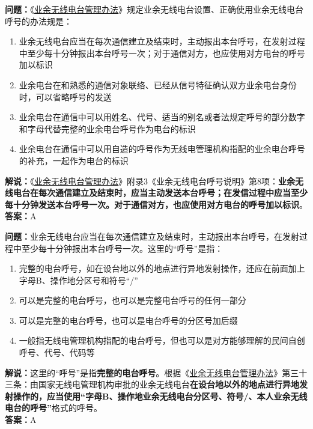 \textbf{问题：}《\href{https://www.miit.gov.cn/jgsj/zfs/bmgz/art/2020/art_147b69815b3641caad9047735f94c860.html}{业余无线电台管理办法}》规定业余无线电台设置、正确使用业余无线电台呼号的办法规是：
\begin{enumerate}[label=\Alph*), leftmargin=1.5cm]
	\item 业余无线电台应当在每次通信建立及结束时，主动报出本台呼号，在发射过程中至少每十分钟报出本台呼号一次；对于通信对方，也应使用对方电台的呼号加以标识
	\item 业余电台在和熟悉的通信对象联络、已经从信号特征确认双方业余电台身份时，可以省略呼号的发送
	\item 业余电台在通信中可以用姓名、代号、适当的别名或者法规定呼号的部分数字和字母代替完整的业余电台呼号作为电台的标识
	\item 业余电台在通信中可以用自造的呼号作为无线电管理机构指配的业余电台呼号的补充，一起作为电台的标识
\end{enumerate}
\textbf{解说：}《\href{https://www.miit.gov.cn/jgsj/zfs/bmgz/art/2020/art_147b69815b3641caad9047735f94c860.html}{业余无线电台管理办法}》附录3《业余无线电台呼号说明》第8项：\textbf{业余无线电台在每次通信建立及结束时，应当主动发送本台呼号；在发信过程中应当至少每十分钟发送本台呼号一次。对于通信对方，也应使用对方电台的呼号加以标识}。\\\textbf{答案：}A

\textbf{问题：}业余无线电台应当在每次通信建立及结束时，主动报出本台呼号，在发射过程中至少每十分钟报出本台呼号一次。这里的“呼号”是指：
\begin{enumerate}[label=\Alph*), leftmargin=1.5cm]
	\item 完整的电台呼号，如在设台地以外的地点进行异地发射操作，还应在前面加上字母B、操作地分区号和符号“/”
	\item 可以是完整的电台呼号，也可以是完整电台呼号的任何一部分
	\item 可以是完整的电台呼号，也可以是电台呼号的分区号加后缀
	\item 一般指无线电管理机构指配的电台呼号，但也可以是对方能够理解的民间自创呼号、代号、代码等
\end{enumerate}
\textbf{解说：}这里的“呼号”是指\textbf{完整的电台呼号}。根据《\href{https://www.miit.gov.cn/jgsj/zfs/bmgz/art/2020/art_147b69815b3641caad9047735f94c860.html}{业余无线电台管理办法}》第三十三条：由国家无线电管理机构审批的业余无线电台\textbf{在设台地以外的地点进行异地发射操作的，应当使用“字母B、操作地业余无线电台分区号、符号/、本人业余无线电台的呼号”}格式的呼号。\\\textbf{答案：}A

